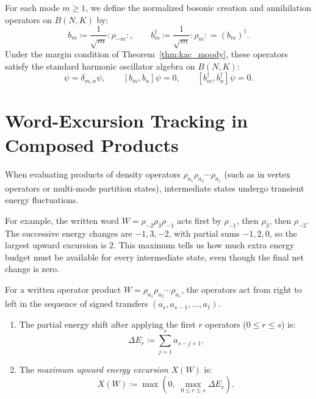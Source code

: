\begin{definition}
For each mode $m \ge 1$, we define the normalized bosonic creation and annihilation operators on $B(N, K)$ by:
\begin{equation}
b_m \coloneqq \frac{1}{\sqrt{m}} :\!\rho_{-m}\!:, \qquad b_m^\dagger \coloneqq \frac{1}{\sqrt{m}} :\!\rho_m\!: = (b_m)^\dagger.
\end{equation}
Under the margin condition of Theorem~\ref{thm:kac_moody}, these operators satisfy the standard harmonic oscillator algebra on $B(N, K)$:
\begin{equation}
[b_m, b_n^\dagger] \psi = \delta_{m, n} \psi, \qquad [b_m, b_n] \psi = 0, \qquad [b_m^\dagger, b_n^\dagger] \psi = 0.
\end{equation}
\end{definition}

\section{Word-Excursion Tracking in Composed Products}

When evaluating products of density operators $\rho_{a_1} \rho_{a_2} \cdots \rho_{a_s}$ (such as in vertex operators or multi-mode partition states), intermediate states undergo transient energy fluctuations.

\begin{remark}
For example, the written word $W=\rho_{-2}\rho_3\rho_{-1}$ acts first by $\rho_{-1}$, then $\rho_3$, then $\rho_{-2}$. The successive energy changes are $-1,3,-2$, with partial sums $-1,2,0$, so the largest upward excursion is $2$. This maximum tells us how much extra energy budget must be available for every intermediate state, even though the final net change is zero.
\end{remark}

\begin{definition}
For a written operator product $W = \rho_{a_1} \rho_{a_2} \cdots \rho_{a_s}$, the operators act from right to left in the sequence of signed transfers $(a_s, a_{s-1}, \dots, a_1)$.
\begin{enumerate}
    \item The partial energy shift after applying the first $r$ operators ($0 \le r \le s$) is:
    \begin{equation}
    \Delta E_r \coloneqq \sum_{j=1}^r a_{s - j + 1}.
    \end{equation}
    \item The \emph{maximum upward energy excursion} $X(W)$ is:
    \begin{equation}
    X(W) \coloneqq \max\left(0, \; \max_{0 \le r \le s} \Delta E_r \right).
    \end{equation}
\end{enumerate}
\end{definition}

